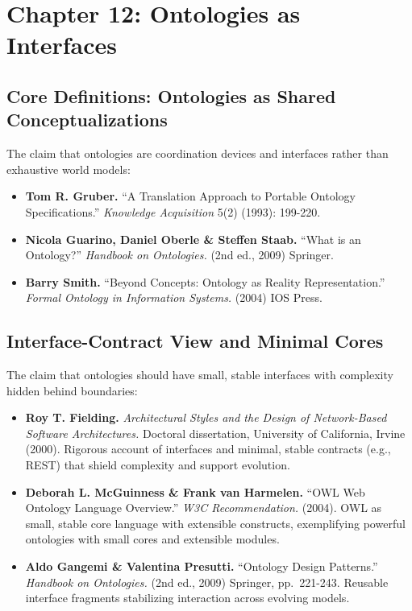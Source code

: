 \documentclass[
  openright]{book}
\begin{document}
\section{Chapter 12: Ontologies as
Interfaces}\label{chapter-12-ontologies-as-interfaces}

\subsection{Core Definitions: Ontologies as Shared
Conceptualizations}\label{core-definitions-ontologies-as-shared-conceptualizations}

The claim that ontologies are coordination devices and interfaces rather
than exhaustive world models:

\begin{itemize}
\item
  \textbf{Tom R. Gruber.} ``A Translation Approach to Portable Ontology
  Specifications.'' \emph{Knowledge Acquisition} 5(2) (1993): 199-220.
\item
  \textbf{Nicola Guarino, Daniel Oberle \& Steffen Staab.} ``What is an
  Ontology?'' \emph{Handbook on Ontologies.} (2nd ed., 2009) Springer.
\item
  \textbf{Barry Smith.} ``Beyond Concepts: Ontology as Reality
  Representation.'' \emph{Formal Ontology in Information Systems.}
  (2004) IOS Press.
\end{itemize}

\subsection{Interface-Contract View and Minimal
Cores}\label{interface-contract-view-and-minimal-cores}

The claim that ontologies should have small, stable interfaces with
complexity hidden behind boundaries:

\begin{itemize}
\item
  \textbf{Roy T. Fielding.} \emph{Architectural Styles and the Design of
  Network-Based Software Architectures.} Doctoral dissertation,
  University of California, Irvine (2000). Rigorous account of
  interfaces and minimal, stable contracts (e.g., REST) that shield
  complexity and support evolution.
\item
  \textbf{Deborah L. McGuinness \& Frank van Harmelen.} ``OWL Web
  Ontology Language Overview.'' \emph{W3C Recommendation.} (2004). OWL
  as small, stable core language with extensible constructs,
  exemplifying powerful ontologies with small cores and extensible
  modules.
\item
  \textbf{Aldo Gangemi \& Valentina Presutti.} ``Ontology Design
  Patterns.'' \emph{Handbook on Ontologies.} (2nd ed., 2009) Springer,
  pp.~221-243. Reusable interface fragments stabilizing interaction
  across evolving models.
\end{itemize}
\end{document}
